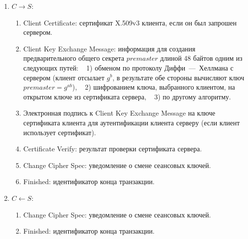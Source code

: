 \begin{enumerate}
    \item $C \rightarrow S$:
        \begin{enumerate}
            \item Client Certificate: сертификат X.509v3 клиента, если он был запрошен сервером.
            \item Client Key Exchange Message: информация для создания предварительного общего секрета $premaster$ длиной 48 байтов одним из следующих путей: ~ 1) обменом по протоколу Диффи~---~Хеллмана с сервером (клиент отсылает $g^b$, в результате обе стороны вычисляют ключ $premaster = g^{ab}$), ~ 2) шифрованием ключа, выбранного клиентом, на открытом ключе из сертификата сервера, ~ 3) по другому алгоритму.
            \item Электронная подпись к Client Key Exchange Message на ключе сертификата клиента для аутентификации клиента серверу (если клиент использует сертификат).
            \item Certificate Verify: результат проверки сертификата сервера.
            \item Change Cipher Spec: уведомление о смене сеансовых ключей.
            \item Finished: идентификатор конца транзакции.
        \end{enumerate}

    \item $C \leftarrow S$:
        \begin{enumerate}
            \item Change Cipher Spec: уведомление о смене сеансовых ключей.
            \item Finished: идентификатор конца транзакции.
        \end{enumerate}
\end{enumerate}




